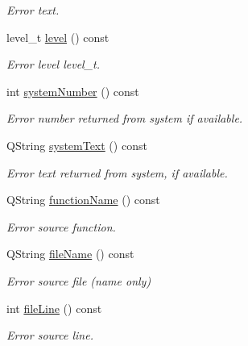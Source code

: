 \begin{DoxyCompactItemize}
\begin{DoxyCompactList}\small\item\em Error text. \end{DoxyCompactList}\item 
\hypertarget{classmdt_error_a8d8382d3008de890689df415deb7766e}{
level\_\-t \hyperlink{classmdt_error_a8d8382d3008de890689df415deb7766e}{level} () const }
\label{classmdt_error_a8d8382d3008de890689df415deb7766e}

\begin{DoxyCompactList}\small\item\em Error level  level\_\-t. \end{DoxyCompactList}\item 
\hypertarget{classmdt_error_a1be3f45cd56b3142f50c288df9f53204}{
int \hyperlink{classmdt_error_a1be3f45cd56b3142f50c288df9f53204}{systemNumber} () const }
\label{classmdt_error_a1be3f45cd56b3142f50c288df9f53204}

\begin{DoxyCompactList}\small\item\em Error number returned from system if available. \end{DoxyCompactList}\item 
\hypertarget{classmdt_error_a6cd449e657f321b86d234269b5e92cda}{
QString \hyperlink{classmdt_error_a6cd449e657f321b86d234269b5e92cda}{systemText} () const }
\label{classmdt_error_a6cd449e657f321b86d234269b5e92cda}

\begin{DoxyCompactList}\small\item\em Error text returned from system, if available. \end{DoxyCompactList}\item 
\hypertarget{classmdt_error_abff9bc71ff554f6f6189be88b0afa731}{
QString \hyperlink{classmdt_error_abff9bc71ff554f6f6189be88b0afa731}{functionName} () const }
\label{classmdt_error_abff9bc71ff554f6f6189be88b0afa731}

\begin{DoxyCompactList}\small\item\em Error source function. \end{DoxyCompactList}\item 
\hypertarget{classmdt_error_af7c2c371678ebd45698a990502addbd8}{
QString \hyperlink{classmdt_error_af7c2c371678ebd45698a990502addbd8}{fileName} () const }
\label{classmdt_error_af7c2c371678ebd45698a990502addbd8}

\begin{DoxyCompactList}\small\item\em Error source file (name only) \end{DoxyCompactList}\item 
\hypertarget{classmdt_error_a7f5a9ac5e896ba24009bcadddcfe79cb}{
int \hyperlink{classmdt_error_a7f5a9ac5e896ba24009bcadddcfe79cb}{fileLine} () const }
\label{classmdt_error_a7f5a9ac5e896ba24009bcadddcfe79cb}

\begin{DoxyCompactList}\small\item\em Error source line. \end{DoxyCompactList}\end{DoxyCompactItemize}


